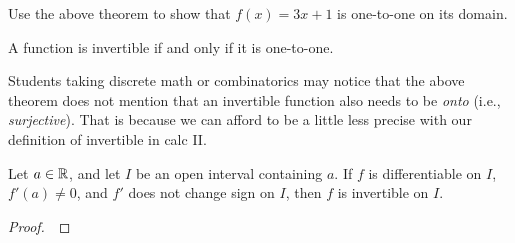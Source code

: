 \begin{example}
Use the above theorem to show that $f(x)=3x+1$ is one-to-one on its domain.
\end{example}

\ifdefined\SOLUTION
{}
\else
\fi
\vfill

\newpage

\begin{theorem}
A function is invertible if and only if it is one-to-one.
\end{theorem}

\begin{remark}
Students taking discrete math or combinatorics may notice that the above theorem does not mention that an invertible function also needs to be \textit{onto} (i.e., \textit{surjective}).
That is because we can afford to be a little less precise with our definition of invertible in calc II.
\end{remark}

\begin{corollary}
Let $a\in\mathbb R$, and let $I$ be an open interval containing $a$.
If $f$ is differentiable on $I$, $f'(a)\ne 0$, and $f'$ does not change sign on $I$, then $f$ is invertible on $I$.
\end{corollary}

\ifdefined\SOLUTION
{}
\else
\begin{proof}\,

\vspace{4in}

\end{proof}
\fi

\newpage

